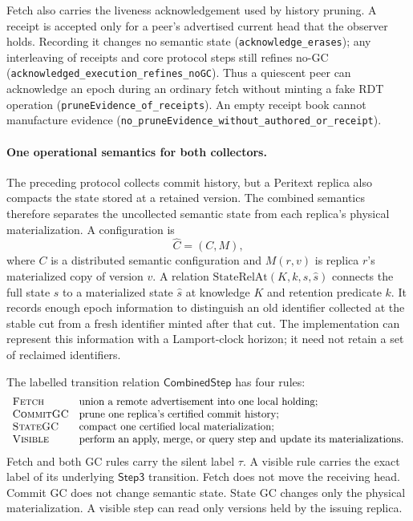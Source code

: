 \documentclass[11pt]{article}
\newcommand{\lean}[1]{\texttt{#1}}
\begin{document}
Fetch also carries the liveness acknowledgement used by history pruning. A
receipt is accepted only for a peer's advertised current head that the observer
holds. Recording it changes no semantic state (\lean{acknowledge\_erases});
any interleaving of receipts and core protocol steps still refines no-GC
(\lean{acknowledged\_execution\_refines\_noGC}). Thus a quiescent peer can
acknowledge an epoch during an ordinary fetch without minting a fake RDT
operation (\lean{pruneEvidence\_of\_receipts}). An empty receipt book cannot
manufacture evidence
(\lean{no\_pruneEvidence\_without\_authored\_or\_receipt}).

\paragraph{One operational semantics for both collectors.}
The preceding protocol collects commit history, but a Peritext replica also
compacts the state stored at a retained version.  The combined semantics
therefore separates the uncollected semantic state from each replica's
physical materialization.  A configuration is
\[
  \widehat C = (C, M),
\]
where $C$ is a distributed semantic configuration and $M(r,v)$ is replica
$r$'s materialized copy of version $v$.  A relation
$\mathrm{StateRelAt}(K,k,s,\widehat s)$ connects the full state $s$ to a
materialized state $\widehat s$ at knowledge $K$ and retention predicate $k$.
It records enough epoch information to distinguish an old identifier collected
at the stable cut from a fresh identifier minted after that cut.  The
implementation can represent this information with a Lamport-clock horizon;
it need not retain a set of reclaimed identifiers.

The labelled transition relation $\mathsf{CombinedStep}$ has four rules:
\[
\begin{array}{ll}
\textsc{Fetch} & \text{union a remote advertisement into one local holding;}\\
\textsc{CommitGC} & \text{prune one replica's certified commit history;}\\
\textsc{StateGC} & \text{compact one certified local materialization;}\\
\textsc{Visible} & \text{perform an apply, merge, or query step and update its
materializations.}
\end{array}
\]
Fetch and both GC rules carry the silent label $\tau$.  A visible rule carries
the exact label of its underlying $\mathsf{Step3}$ transition.  Fetch does not
move the receiving head.  Commit GC does not change semantic state.  State GC
changes only the physical materialization.  A visible step can read only
versions held by the issuing replica.
\end{document}
